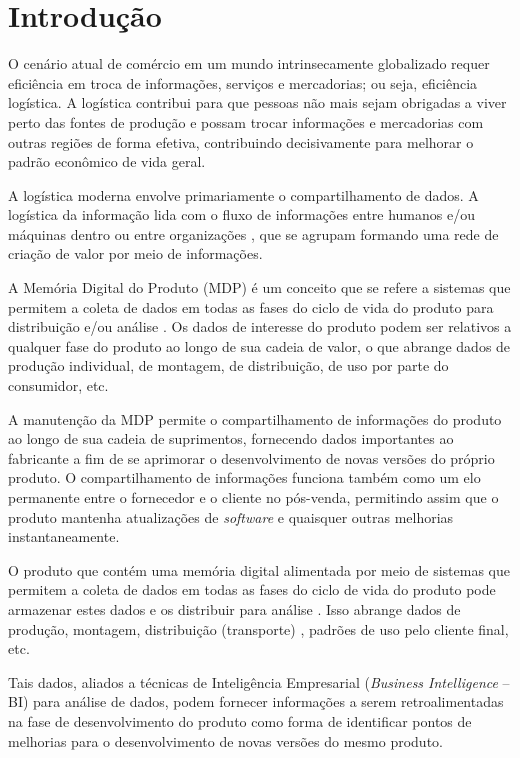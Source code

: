 \chapter{Introdução}
\label{cha:introducao}

O cenário atual de comércio em um mundo intrinsecamente globalizado requer eficiência em troca de informações, serviços e mercadorias; ou seja, eficiência logística. A logística contribui para que pessoas não mais sejam obrigadas a viver perto das fontes de produção e possam trocar informações e mercadorias com outras regiões de forma efetiva, contribuindo decisivamente para melhorar o padrão econômico de vida geral.

A logística moderna envolve primariamente o compartilhamento de dados. A logística da informação lida com o fluxo de informações entre humanos e/ou máquinas dentro ou entre organizações \cite{haftor2009information}, que se agrupam formando uma rede de criação de valor por meio de informações.

A Memória Digital do Produto (MDP) é um conceito que se refere a sistemas que permitem a coleta de dados em todas as fases do ciclo de vida do produto para distribuição e/ou análise \cite{wahlster2007digitalmemory}. Os dados de interesse do produto podem ser relativos a qualquer fase do produto ao longo de sua cadeia de valor, o que abrange dados de produção individual, de montagem, de distribuição, de uso por parte do consumidor, etc.

A manutenção da MDP permite o compartilhamento de informações do produto ao longo de sua cadeia de suprimentos, fornecendo dados importantes ao fabricante a fim de se aprimorar o desenvolvimento de novas versões do próprio produto. O compartilhamento de informações funciona também como um elo permanente entre o fornecedor e o cliente no pós-venda, permitindo assim que o produto mantenha atualizações de \textit{software} e quaisquer outras melhorias instantaneamente.

O produto que contém uma memória digital alimentada por meio de sistemas que permitem a coleta de dados em todas as fases do ciclo de vida do produto pode armazenar estes dados e os distribuir para análise \cite{lasi2014industryfour}. Isso abrange dados de produção, montagem, distribuição (transporte) \cite{brandherm2011productmemory}, padrões de uso pelo cliente final, etc.

Tais dados, aliados a técnicas de Inteligência Empresarial (\textit{Business Intelligence} -- BI) para análise de dados, podem fornecer informações a serem retroalimentadas na fase de desenvolvimento do produto como forma de identificar pontos de melhorias para o desenvolvimento de novas versões do mesmo produto.

